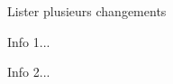 \begin{bdoctopic}{Lister plusieurs changements}
    \item Info 1...
    \item Info 2...
\end{bdoctopic}
